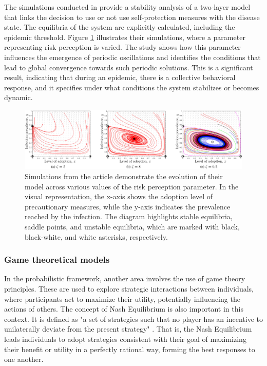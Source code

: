 The simulations conducted in \cite{Frieswijk_2022} provide a stability analysis of a two-layer model that links the decision to use or not use self-protection measures with the disease state. The equilibria of the system are explicitly calculated, including the epidemic threshold. Figure \ref{fig:stability_friesjiw} illustrates their simulations, where a parameter representing risk perception is varied. The study shows how this parameter influences the emergence of periodic oscillations and identifies the conditions that lead to global convergence towards such periodic solutions. This is a significant result, indicating that during an epidemic, there is a collective behavioral response, and it specifies under what conditions the system stabilizes or becomes dynamic.

\begin{figure}[h]
	\centering
	\includegraphics[width=0.95\linewidth]{0_introduction/images_review/stable_unstable_equilibria_friejs}
	\caption[Stability analysis of epi-behavior model]{Simulations from the article \cite{Frieswijk_2022} demonstrate the evolution of their model across various values of the risk perception parameter. In the visual representation, the x-axis shows the adoption level of precautionary measures, while the y-axis indicates the prevalence reached by the infection. The diagram highlights stable equilibria, saddle points, and unstable equilibria, which are marked with black, black-white, and white asterisks, respectively.}
	\label{fig:stability_friesjiw}
\end{figure}

\subsubsection{Game theoretical models}
In the probabilistic framework, another area involves the use of game theory principles. These are used to explore strategic interactions between individuals, where participants act to maximize their utility, potentially influencing the actions of others. The concept of Nash Equilibrium is also important in this context. It is defined as "a set of strategies such that no player has an incentive to unilaterally deviate from the present strategy" \cite{Wang_2015_review}. That is, the Nash Equilibrium leads individuals to adopt strategies consistent with their goal of maximizing their benefit or utility in a perfectly rational way, forming the best responses to one another.

